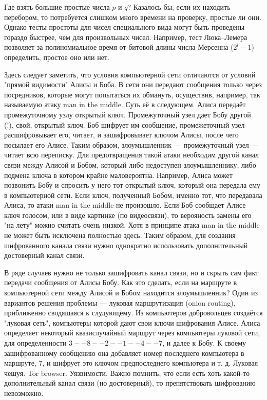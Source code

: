 \documentclass{book}
\begin{document}
Где взять большие простые числа $p$ и $q$? Казалось бы, если их находить перебором, то потребуется
слишком много времени на проверку, простые ли они. Однако тесты простоты для чисел
специального вида могут быть проведены гораздо быстрее, чем для произвольных чисел. Например, тест
Люка--Лемера позволяет за полиномиальное время от битовой длины числа Мерсенна ($2^l - 1$)
определить, простое оно или нет.

Здесь следует заметить, что условия компьютерной сети отличаются от условий "прямой видимости"
Алисы и Боба. В сети они передают сообщения только через посредников, которые могут попытаться их
обмануть, осуществив, например, так называемую атаку man in the middle. Суть её в следующем. Алиса
передаёт промежуточному узлу открытый ключ. Промежуточный узел дает Бобу другой (!), свой, открытый
ключ. Боб шифрует им сообщение, промежеточный узел расшифровывает его, читает, и зашифровывает
ключом Алисы, после чего посылает его Алисе. Таким образом, злоумышленник --- промежуточный узел
--- читает всю переписку. Для предотвращения такой атаки необходим другой канал связи между Алисой
и Бобом, который либо недоступен злоумышленнику, либо подмена ключа в котором крайне маловероятна.
Например, Алиса может позвонить Бобу и спросить у него тот открытый ключ, который она передала ему
в компьютерной сети. Если ключ, полученный Бобом, именно тот, что передавала Алиса, то атаки man in
the middle не произошло. Если Боб сообщает Алисе ключ голосом, или в виде картинке (по видеосвязи),
то верояность замены его "на лету" можно считать очень низкой. Хотя в принципе атака man in the
middle не может быть исключена полностью здесь. Таким образом, для создания шифрованного канала
связи нужно однократно использовать дополнительный достоверный канал связи.

В ряде случаев нужно не только зашифровать канал связи, но и скрыть сам факт передачи сообщения от
Алисы Бобу. Как это сделать, если на маршруте в компьютерной сети между Алисой и Бобом находится
злоумышленник? Один из вариантов решения проблемы --- луковая маршрутизация (onion routing),
приближенно сводящаяся к слудующему. Из компьютеров добровольцев создаётся "луковая сеть",
компьютеры которой дают свои ключи шифрования Алисе. Алиса определяет некоторый квазислучайный
маршрут через компьютеры луковой сети, для определенности $3--8--2--1--4--7$, и далее к Бобу. К
своему зашифрованному сообщению она добавляет номер последнего компьютера в маршруте, 7, и шифрует
это ключом предпоследнего компьютера и т. д. Луковая чешуя. Tor browser. Уязвимости. Важно помнить,
что если есть хоть какой-то дополнительный канал связи (но достоверный), то препятствовать
шифрованию невозможно.
\end{document}
